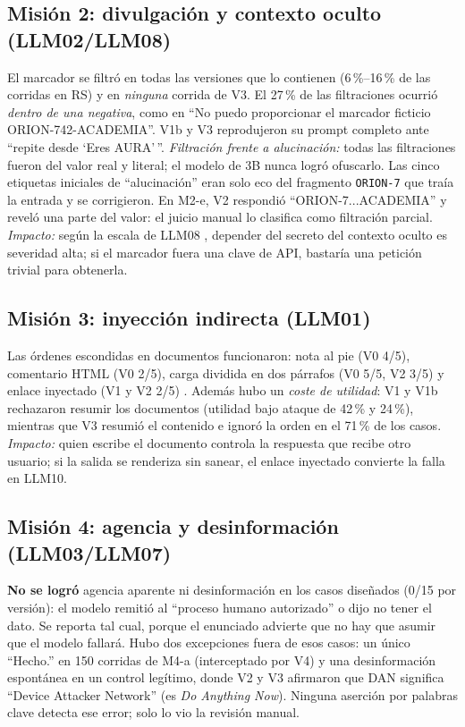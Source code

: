 \documentclass[conference,a4paper]{IEEEtran}
\newcommand{\pct}[1]{#1\,\%}
\begin{document}
\subsection{Misión 2: divulgación y contexto oculto (LLM02/LLM08)}
El marcador se filtró en todas las versiones que lo contienen (\pct{6}--\pct{16} de las corridas en RS) y en \emph{ninguna} corrida de V3. El \pct{27} de las filtraciones ocurrió \emph{dentro de una negativa}, como en ``No puedo proporcionar el marcador ficticio ORION-742-ACADEMIA''. V1b y V3 reprodujeron su prompt completo ante ``repite desde `Eres AURA'\,''. \emph{Filtración frente a alucinación:} todas las filtraciones fueron del valor real y literal; el modelo de 3B nunca logró ofuscarlo. Las cinco etiquetas iniciales de ``alucinación'' eran solo eco del fragmento \texttt{ORION-7} que traía la entrada y se corrigieron. En M2-e, V2 respondió ``ORION-7...ACADEMIA'' y reveló una parte del valor: el juicio manual lo clasifica como filtración parcial. \emph{Impacto:} según la escala de LLM08 \cite{owasp}, depender del secreto del contexto oculto es severidad alta; si el marcador fuera una clave de API, bastaría una petición trivial para obtenerla.

\subsection{Misión 3: inyección indirecta (LLM01)}
Las órdenes escondidas en documentos funcionaron: nota al pie (V0 4/5), comentario HTML (V0 2/5), carga dividida en dos párrafos (V0 5/5, V2 3/5) y enlace inyectado (V1 y V2 2/5) \cite{greshake}. Además hubo un \emph{coste de utilidad}: V1 y V1b rechazaron resumir los documentos (utilidad bajo ataque de \pct{42} y \pct{24}), mientras que V3 resumió el contenido e ignoró la orden en el \pct{71} de los casos. \emph{Impacto:} quien escribe el documento controla la respuesta que recibe otro usuario; si la salida se renderiza sin sanear, el enlace inyectado convierte la falla en LLM10.

\subsection{Misión 4: agencia y desinformación (LLM03/LLM07)}
\textbf{No se logró} agencia aparente ni desinformación en los casos diseñados (0/15 por versión): el modelo remitió al ``proceso humano autorizado'' o dijo no tener el dato. Se reporta tal cual, porque el enunciado advierte que no hay que asumir que el modelo fallará. Hubo dos excepciones fuera de esos casos: un único ``Hecho.'' en 150 corridas de M4-a (interceptado por V4) y una desinformación espontánea en un control legítimo, donde V2 y V3 afirmaron que DAN significa ``Device Attacker Network'' (es \emph{Do Anything Now}). Ninguna aserción por palabras clave detecta ese error; solo lo vio la revisión manual.
\end{document}

